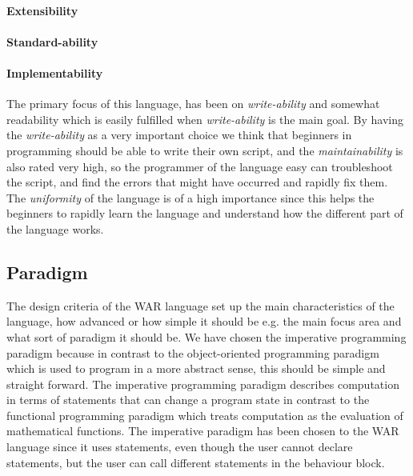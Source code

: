 \paragraph{Extensibility} 
\paragraph{Standard-ability} 
\paragraph{Implementability} 


The primary focus of this language, has been on \textit{write-ability} and somewhat readability which is easily fulfilled when \textit{write-ability} is the main goal. By having the \textit{write-ability} as a very important choice we think that beginners in programming should be able to write their own script, and the \textit{maintainability} is also rated very high, so the programmer of the language easy can troubleshoot the script, and find the errors that might have occurred and rapidly fix them. The \textit{uniformity} of the language is of a high importance since this helps the beginners to rapidly learn the language and understand how the different part of the language works.


\subsection{Paradigm}
The design criteria of the WAR language set up the main characteristics of the language, how advanced or how simple it should be e.g. the main focus area and what sort of paradigm it should be. We have chosen the imperative programming paradigm because in contrast to the object-oriented programming paradigm which is used to program in a more abstract sense, this should be simple and straight forward. The imperative programming paradigm describes computation in terms of statements that can change a program state in contrast to the functional programming paradigm which treats computation as the evaluation of mathematical functions. The imperative paradigm has been chosen to the WAR language since it uses statements, even though the user cannot declare statements, but the user can call different statements in the behaviour block. 


